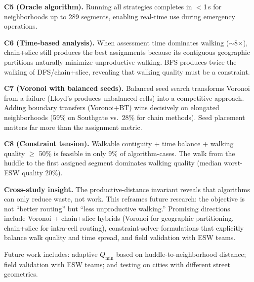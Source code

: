 \documentclass[conference]{IEEEtran}
\begin{document}
\textbf{C5 (Oracle algorithm).} Running all strategies completes in $<$1\,s for neighborhoods up to 289 segments, enabling real-time use during emergency operations.

\textbf{C6 (Time-based analysis).} When assessment time dominates walking ($\sim$8$\times$), chain+slice still produces the best assignments because its contiguous geographic partitions naturally minimize unproductive walking. BFS produces twice the walking of DFS/chain+slice, revealing that walking quality must be a constraint.

\textbf{C7 (Voronoi with balanced seeds).} Balanced seed search transforms Voronoi from a failure (Lloyd's produces unbalanced cells) into a competitive approach. Adding boundary transfers (Voronoi+BT) wins decisively on elongated neighborhoods (59\% on Southgate vs.\ 28\% for chain methods). Seed placement matters far more than the assignment metric.

\textbf{C8 (Constraint tension).} Walkable contiguity + time balance + walking quality $\geq$ 50\% is feasible in only 9\% of algorithm-cases. The walk from the huddle to the first assigned segment dominates walking quality (median worst-ESW quality 20\%).

\textbf{Cross-study insight.} The productive-distance invariant reveals that algorithms can only reduce waste, not work. This reframes future research: the objective is not ``better routing'' but ``less unproductive walking.'' Promising directions include Voronoi + chain+slice hybrids (Voronoi for geographic partitioning, chain+slice for intra-cell routing), constraint-solver formulations that explicitly balance walk quality and time spread, and field validation with ESW teams.

Future work includes: adaptive $Q_{\min}$ based on huddle-to-neighborhood distance; field validation with ESW teams; and testing on cities with different street geometries.
\end{document}

